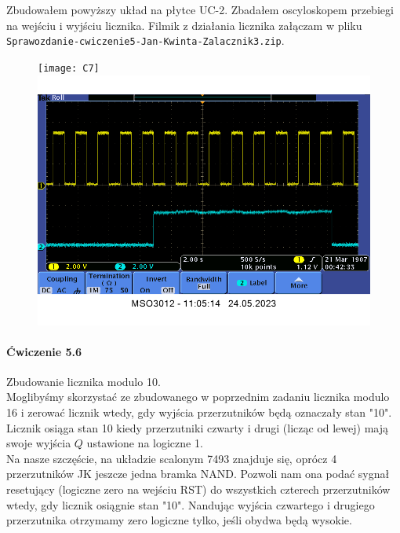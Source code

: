 \documentclass[14pt, table]{extarticle}
\begin{document}
Zbudowałem powyższy układ na płytce UC-2. Zbadałem oscyloskopem przebiegi na wejściu i wyjściu licznika. Filmik z działania licznika załączam w pliku \texttt{Sprawozdanie-cwiczenie5-Jan-Kwinta-Zalacznik3.zip}.

\newpage

\begin{figure}[H]
\texttt{[image: C7]}
\includegraphics[width=16cm]{A1}
\centering
\captionsetup{labelformat=empty}
\caption{}
\end{figure}

\newpage
\paragraph{Ćwiczenie 5.6 \\}

Zbudowanie licznika modulo 10. \\
	
Moglibyśmy skorzystać ze zbudowanego w poprzednim zadaniu licznika modulo 16 i zerować licznik wtedy, gdy wyjścia przerzutników będą oznaczały stan "10". Licznik osiąga stan 10 kiedy przerzutniki czwarty i drugi (licząc od lewej) mają swoje wyjścia $Q$ ustawione na logiczne 1.  \\

Na nasze szczęście, na układzie scalonym 7493 znajduje się, oprócz 4 przerzutników JK jeszcze jedna bramka NAND. Pozwoli nam ona podać sygnał resetujący (logiczne zero na wejściu RST) do wszystkich czterech przerzutników wtedy, gdy licznik osiągnie stan "10". Nandując wyjścia czwartego i drugiego przerzutnika otrzymamy zero logiczne tylko, jeśli obydwa będą wysokie. \\
\end{document}
